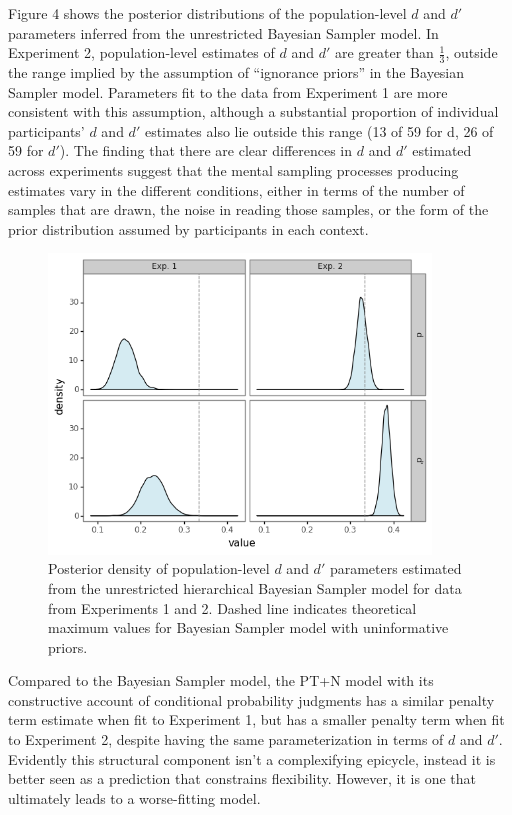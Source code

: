 \documentclass[
  english,
  man,floatsintext]{apa6}
\begin{document}
Figure 4 shows the posterior distributions of the population-level \(d\) and \(d'\) parameters inferred from the unrestricted Bayesian Sampler model. In Experiment 2, population-level estimates of \(d\) and \(d'\) are greater than \(\frac{1}{3}\), outside the range implied by the assumption of ``ignorance priors'' in the Bayesian Sampler model. Parameters fit to the data from Experiment 1 are more consistent with this assumption, although a substantial proportion of individual participants' \(d\) and \(d'\) estimates also lie outside this range (13 of 59 for d, 26 of 59 for \(d'\)). The finding that there are clear differences in \(d\) and \(d'\) estimated across experiments suggest that the mental sampling processes producing estimates vary in the different conditions, either in terms of the number of samples that are drawn, the noise in reading those samples, or the form of the prior distribution assumed by participants in each context.

\begin{figure}[ht]
\centering
\includegraphics[width=4in]{plot_params.png}
\caption{Posterior density of population-level $d$  and $d'$ parameters estimated from the unrestricted hierarchical Bayesian Sampler model for data from Experiments 1 and 2. Dashed line indicates theoretical maximum values for Bayesian Sampler model with uninformative priors.}
\end{figure}

Compared to the Bayesian Sampler model, the PT+N model with its constructive account of conditional probability judgments has a similar penalty term estimate when fit to Experiment 1, but has a smaller penalty term when fit to Experiment 2, despite having the same parameterization in terms of \(d\) and \(d'\). Evidently this structural component isn't a complexifying epicycle, instead it is better seen as a prediction that constrains flexibility. However, it is one that ultimately leads to a worse-fitting model.
\end{document}
